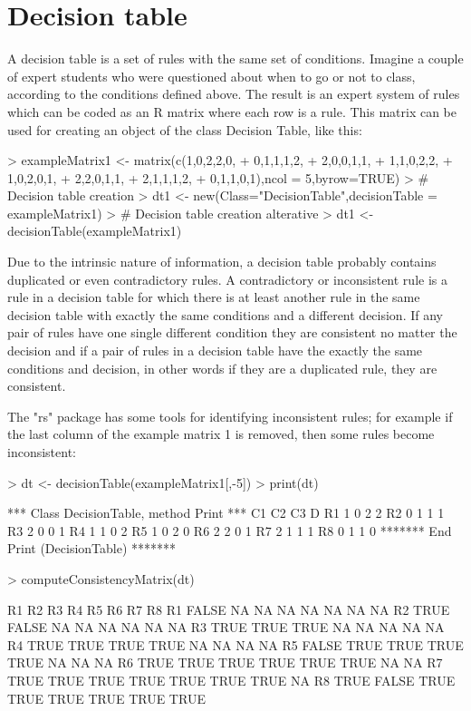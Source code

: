 \documentclass[a4paper]{article}
\begin{document}
\section{Decision table}
A decision table is a set of rules with the same set of conditions. Imagine a couple of expert students who were questioned about when to go or not to class, according to the conditions defined above. The result is an expert system of rules which can be coded as an R matrix where each row is a rule. This matrix can be used for creating an object of the class Decision Table, like this:

\begin{Schunk}
\begin{Sinput}
> exampleMatrix1 <- matrix(c(1,0,2,2,0,
+ 0,1,1,1,2,
+ 2,0,0,1,1,
+ 1,1,0,2,2,
+ 1,0,2,0,1,
+ 2,2,0,1,1,
+ 2,1,1,1,2,
+ 0,1,1,0,1),ncol = 5,byrow=TRUE)
> # Decision table creation
> dt1 <- new(Class="DecisionTable",decisionTable = exampleMatrix1)
> # Decision table creation alterative
> dt1 <- decisionTable(exampleMatrix1)
\end{Sinput}
\end{Schunk}

Due to the intrinsic nature of information, a decision table probably contains duplicated or even contradictory rules. A contradictory or inconsistent rule is a rule in a decision table for which there is at least another rule in the same decision table with exactly the same conditions and a different decision. If any pair of rules have one single different condition they are consistent no matter the decision and if a pair of rules in a decision table have the exactly the same conditions and decision, in other words if they are a duplicated rule, they are consistent. 

The "rs" package has some tools for identifying inconsistent rules; for example if the last column of the example matrix 1 is removed, then some rules become inconsistent:

\begin{Schunk}
\begin{Sinput}
> dt <- decisionTable(exampleMatrix1[,-5])
> print(dt)
\end{Sinput}
\begin{Soutput}
*** Class DecisionTable, method Print *** 
   C1 C2 C3 D
R1 1  0  2  2
R2 0  1  1  1
R3 2  0  0  1
R4 1  1  0  2
R5 1  0  2  0
R6 2  2  0  1
R7 2  1  1  1
R8 0  1  1  0
******* End Print (DecisionTable) ******* 
\end{Soutput}
\begin{Sinput}
> computeConsistencyMatrix(dt)
\end{Sinput}
\begin{Soutput}
      R1    R2   R3   R4   R5   R6   R7   R8
R1 FALSE    NA   NA   NA   NA   NA   NA   NA
R2  TRUE FALSE   NA   NA   NA   NA   NA   NA
R3  TRUE  TRUE TRUE   NA   NA   NA   NA   NA
R4  TRUE  TRUE TRUE TRUE   NA   NA   NA   NA
R5 FALSE  TRUE TRUE TRUE TRUE   NA   NA   NA
R6  TRUE  TRUE TRUE TRUE TRUE TRUE   NA   NA
R7  TRUE  TRUE TRUE TRUE TRUE TRUE TRUE   NA
R8  TRUE FALSE TRUE TRUE TRUE TRUE TRUE TRUE
\end{Soutput}
\end{Schunk}
\end{document}
